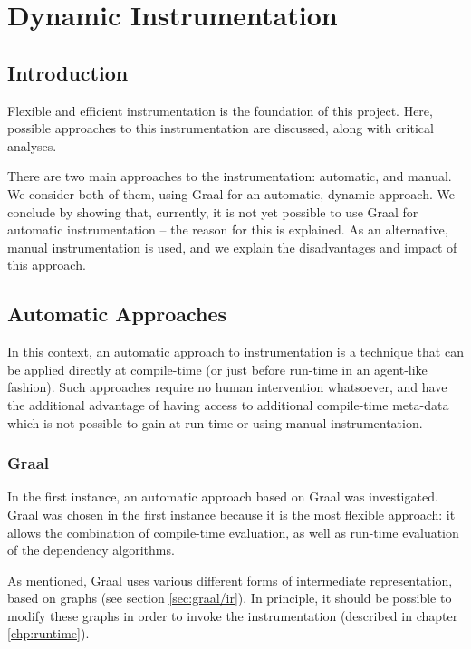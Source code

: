 \chapter{Dynamic Instrumentation} \label{chp:instrumentation}
\section{Introduction} \label{sec:instrumentation/introduction}
Flexible and efficient instrumentation is the foundation of this project. Here, possible approaches to this instrumentation are discussed, along with critical analyses.

There are two main approaches to the instrumentation: automatic, and manual. We consider both of them, using Graal for an automatic, dynamic approach. We conclude by showing that, currently, it is not yet possible to use Graal for automatic instrumentation -- the reason for this is explained. As an alternative, manual instrumentation is used, and we explain the disadvantages and impact of this approach.

\section{Automatic Approaches} \label{sec:instrumentation/automatic}
	In this context, an automatic approach to instrumentation is a technique that can be applied directly at compile-time (or just before run-time in an agent-like fashion). Such approaches require no human intervention whatsoever, and have the additional advantage of having access to additional compile-time meta-data which is not possible to gain at run-time or using manual instrumentation.

	\subsection{Graal} \label{sec:instrumentation/graal}
	In the first instance, an automatic approach based on Graal was investigated. Graal was chosen in the first instance because it is the most flexible approach: it allows the combination of compile-time evaluation, as well as run-time evaluation of the dependency algorithms.
	
	As mentioned, Graal uses various different forms of intermediate representation, based on graphs (see section \ref{sec:graal/ir}). In principle, it should be possible to modify these graphs in order to invoke the instrumentation (described in chapter \ref{chp:runtime}).
	
